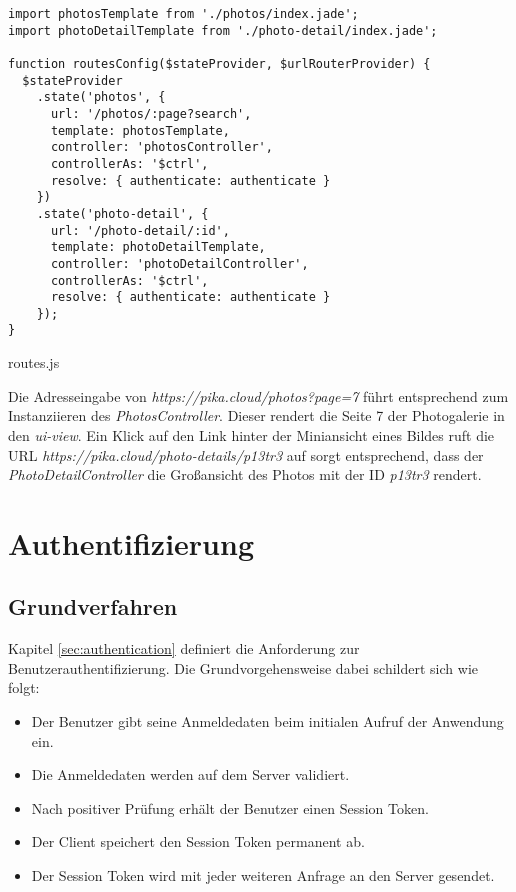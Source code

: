 \begin{listing}[H]
\begin{verbatim}
import photosTemplate from './photos/index.jade';
import photoDetailTemplate from './photo-detail/index.jade';

function routesConfig($stateProvider, $urlRouterProvider) {
  $stateProvider
    .state('photos', {
      url: '/photos/:page?search',
      template: photosTemplate,
      controller: 'photosController',
      controllerAs: '$ctrl',
      resolve: { authenticate: authenticate }
    })
    .state('photo-detail', {
      url: '/photo-detail/:id',
      template: photoDetailTemplate,
      controller: 'photoDetailController',
      controllerAs: '$ctrl',
      resolve: { authenticate: authenticate }
    });
}

\end{verbatim}
\caption{routes.js}
\label{lst:routing_config}
\end{listing}

Die Adresseingabe von \textit{https://pika.cloud/photos?page=7} führt entsprechend zum Instanziieren des \textit{PhotosController}. Dieser rendert die Seite 7 der Photogalerie in den \textit{ui-view}. Ein Klick auf den Link hinter der Miniansicht eines Bildes ruft die URL \textit{https://pika.cloud/photo-details/p13tr3} auf sorgt entsprechend, dass der \textit{PhotoDetailController} die Großansicht des Photos mit der ID  \textit{p13tr3} rendert. 

\section{Authentifizierung}

\subsection{Grundverfahren}

Kapitel \ref{sec:authentication} definiert die Anforderung zur Benutzerauthentifizierung. Die Grundvorgehensweise dabei schildert sich wie folgt:

\begin{itemize}
  \item Der Benutzer gibt seine Anmeldedaten beim initialen Aufruf der Anwendung ein.
  \item Die Anmeldedaten werden auf dem Server validiert.
  \item Nach positiver Prüfung erhält der Benutzer einen Session Token.
  \item Der Client speichert den Session Token permanent ab.
  \item Der Session Token wird mit jeder weiteren Anfrage an den Server gesendet. 
\end{itemize}

